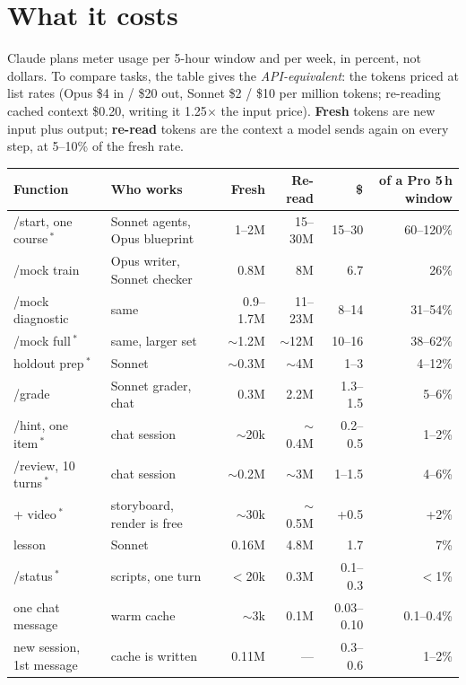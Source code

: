 \documentclass[a4paper,10pt]{article}
\begin{document}
\newpage
\section{What it costs}

Claude plans meter usage per 5-hour window and per week, in percent, not dollars. To
compare tasks, the table gives the \emph{API-equivalent}: the tokens priced at list rates
(Opus \$4 in / \$20 out, Sonnet \$2 / \$10 per million tokens; re-reading cached context
\$0.20, writing it 1.25$\times$ the input price). \textbf{Fresh} tokens are new input plus
output; \textbf{re-read} tokens are the context a model sends again on every step, at 5--10\%
of the fresh rate.

\begin{tabularx}{\linewidth}{@{}>{\ttfamily}l l r r r r@{}}
\toprule
\normalfont Function & Who works & Fresh & Re-read & \$ & of a Pro 5\,h window \\
\midrule
/start, one course\,$^*$ & Sonnet agents, Opus blueprint & 1--2M & 15--30M & 15--30 & 60--120\% \\
/mock train       & Opus writer, Sonnet checker & 0.8M & 8M   & 6.7     & 26\% \\
/mock diagnostic  & same                        & 0.9--1.7M & 11--23M & 8--14 & 31--54\% \\
/mock full\,$^*$  & same, larger set            & $\sim$1.2M & $\sim$12M & 10--16 & 38--62\% \\
holdout prep\,$^*$& Sonnet                      & $\sim$0.3M & $\sim$4M & 1--3 & 4--12\% \\
/grade            & Sonnet grader, chat         & 0.3M & 2.2M & 1.3--1.5 & 5--6\% \\
/hint, one item\,$^*$ & chat session           & $\sim$20k & $\sim$0.4M & 0.2--0.5 & 1--2\% \\
/review, 10 turns\,$^*$ & chat session          & $\sim$0.2M & $\sim$3M & 1--1.5 & 4--6\% \\
\quad + video\,$^*$ & storyboard, render is free & $\sim$30k & $\sim$0.5M & +0.5 & +2\% \\
lesson            & Sonnet                      & 0.16M & 4.8M & 1.7     & 7\% \\
/status\,$^*$     & scripts, one turn           & $<$20k & 0.3M & 0.1--0.3 & $<$1\% \\
one chat message  & warm cache                  & $\sim$3k & 0.1M & 0.03--0.10 & 0.1--0.4\% \\
new session, 1st message & cache is written     & 0.11M & --- & 0.3--0.6 & 1--2\% \\
\bottomrule
\end{tabularx}
\end{document}
